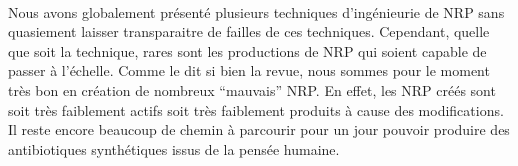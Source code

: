 \documentclass[12pt,french,twoside]{report}
\begin{document}
\paragraph{}Nous avons globalement présenté plusieurs techniques d'ingénieurie de NRP sans quasiement laisser transparaitre de failles de ces techniques.
Cependant, quelle que soit la technique, rares sont les productions de NRP qui soient capable de passer à l'échelle.
Comme le dit si bien la revue, nous sommes pour le moment très bon en création de nombreux ``mauvais'' NRP.
En effet, les NRP créés sont soit très faiblement actifs soit très faiblement produits à cause des modifications.
Il reste encore beaucoup de chemin à parcourir pour un jour pouvoir produire des antibiotiques synthétiques issus de la pensée humaine.




\end{document}
